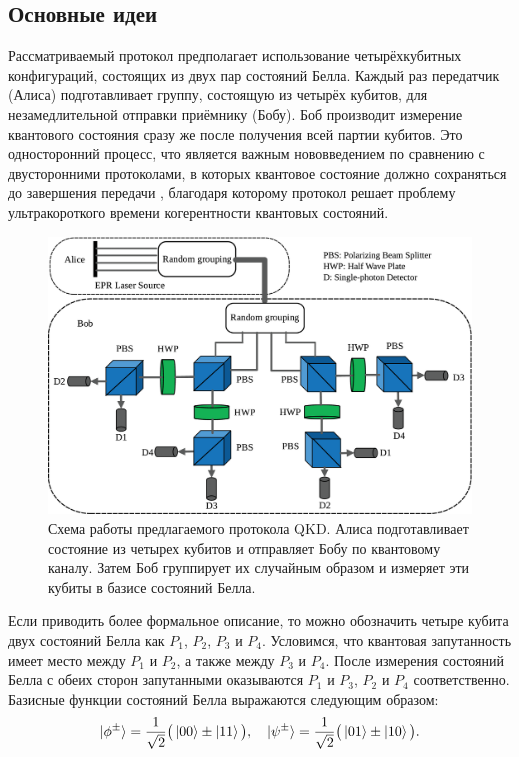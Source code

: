 \documentclass[a4paper,11pt]{article}
\begin{document}
\subsection{Основные идеи}
Рассматриваемый протокол предполагает использование четырёхкубитных конфигураций, состоящих из двух пар состояний Белла. Каждый раз передатчик (Алиса) подготавливает группу, состоящую из четырёх кубитов, для незамедлительной отправки приёмнику (Бобу). Боб производит измерение квантового состояния сразу же после получения всей партии кубитов. Это односторонний процесс, что является важным нововведением по сравнению с двусторонними протоколами, в которых квантовое состояние должно сохраняться до завершения передачи \cite{Gao,nine}, благодаря которому протокол решает проблему ультракороткого времени когерентности квантовых состояний.

\begin{figure}[h!]
	\centering    
	\includegraphics[width=0.75\columnwidth]{scheme.png}
	\caption{Схема работы предлагаемого протокола QKD. Алиса подготавливает состояние из четырех кубитов и отправляет Бобу по квантовому каналу. Затем Боб группирует их случайным образом и измеряет эти кубиты в базисе состояний Белла.}
	\label{im1}
\end{figure}

Если приводить более формальное описание, то можно обозначить четыре кубита двух состояний Белла как $P_1$, $P_2$, $P_3$ и $P_4$. Условимся, что квантовая запутанность имеет место между $P_1$ и $P_2$, а также между $P_3$ и $P_4$. После измерения состояний Белла с обеих сторон запутанными оказываются $P_1$ и $P_3$, $P_2$ и $P_4$ соответственно. Базисные функции состояний Белла выражаются следующим образом:
\begin{equation*}
\ket{\phi^{\pm}} = \dfrac{1}{\sqrt2}\big(\ket{00} \pm \ket{11} \big), \quad
\ket{\psi^{\pm}} = \dfrac{1}{\sqrt2}\big(\ket{01} \pm \ket{10} \big).
\end{equation*}
\end{document}
